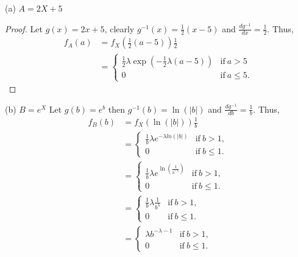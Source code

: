 \documentclass{article}
\newcommand{\deriv}[2]{\frac{d #1}{d#2}}
\begin{document}
(a) $A = 2X + 5$
\begin{proof}
    Let $g(x) = 2x + 5$, clearly $g^{-1}(x) = \frac{1}{2}(x - 5)$ and
    ${\deriv{g^{-1}}{x} = \frac{1}{2}}$. Thus,
    \begin{align*}
        f_A(a) & = f_X(\frac{1}{2}(a - 5))\frac{1}{2}                                                                        \\
               & = \begin{cases}
                       \frac{1}{2}\lambda \exp\left(-\frac{1}{2}\lambda (a-5)\right) & \text{if} \ a > 5     \\
                       0                                                             & \text{if} \ a \leq 5.
                   \end{cases}
    \end{align*}
\end{proof}

(b) $B=e^X$
Let $g(b) = e^b$ then $g^{-1} (b) = \ln(|b|)$ and
$\deriv{g^{-1}}{b} = \frac{1}{b}$. Thus,
\begin{align*}
    f_B(b) & = f_X(\ln(|b|))\frac{1}{b}                                                    \\
           & = \begin{cases}
                   \frac{1}{b} \lambda e^{-\lambda ln(|b|)} & \text{if} \ b > 1,    \\
                   0                                        & \text{if} \ b \leq 1.
               \end{cases}            \\
           & = \begin{cases}
                   \frac{1}{b} \lambda e^{\ln(\frac{1}{b^{-\lambda}})} & \text{if} \ b > 1,    \\
                   0                                                   & \text{if} \ b \leq 1.
               \end{cases} \\
           & = \begin{cases}
                   \frac{1}{b} \lambda \frac{1}{b^\lambda} & \text{if} \ b > 1,    \\
                   0                                       & \text{if} \ b \leq 1.
               \end{cases}             \\
           & = \begin{cases}
                   \lambda b^{-\lambda - 1} & \text{if} \ b > 1,    \\
                   0                        & \text{if} \ b \leq 1.
               \end{cases}
\end{align*}
\end{document}
